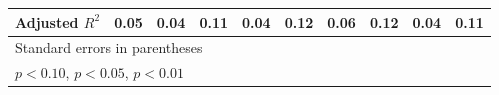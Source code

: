 \begin{table}[htbp]
\begin{tabular}{l*{9}{c}}
Adjusted \(R^{2}\)&     0.05         &     0.04         &     0.11         &     0.04         &     0.12         &     0.06         &     0.12         &     0.04         &     0.11         \\
\hline\hline
\multicolumn{10}{l}{\footnotesize Standard errors in parentheses}\\
\multicolumn{10}{l}{\footnotesize \sym{*} \(p<0.10\), \sym{**} \(p<0.05\), \sym{***} \(p<0.01\)}\\
\end{tabular}
\end{table}
